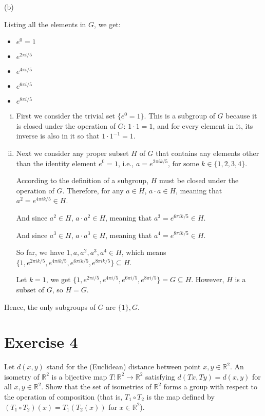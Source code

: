 \documentclass{article}
\begin{document}
(b)

Listing all the elements in $G$, we get:

\begin{itemize}
\item $e^0 = 1$
\item $e^{2\pi i/5}$
\item $e^{4\pi i/5}$
\item $e^{6\pi i/5}$
\item $e^{8\pi i/5}$
\end{itemize}

\begin{enumerate}[(i)]
\item First we consider the trivial set $\{e^0 = 1\}$. This is a subgroup of $G$ because it is closed under the operation of $G$: $1 \cdot 1 = 1$, and for every element in it, its inverse is also in it so that $1 \cdot 1^{-1} = 1$.

\item Next we consider any proper subset $H$ of $G$ that contains any elements other than the identity element $e^0 = 1$, i.e., $a = e^{2\pi i k/5} \text{, for some } k \in \{1,2,3,4\}$.

According to the definition of a subgroup, $H$ must be closed under the operation of $G$. Therefore, for any $a \in H$, $a \cdot a \in H$, meaning that $a^2 = e^{4\pi i k/5} \in H$.

And since $a^2 \in H$, $a \cdot a^2 \in H$, meaning that $a^3 = e^{6\pi i k/5} \in H$.

And since $a^3 \in H$, $a \cdot a^3 \in H$, meaning that $a^4 = e^{8\pi i k/5} \in H$.

So far, we have $1, a, a^2, a^3, a^4 \in H$, which means $\{1, e^{2\pi i k/5}, e^{4\pi i k/5}, e^{6\pi i k/5}, e^{8\pi i k/5}\} \subseteq H$.

Let $k=1$, we get $\{1, e^{2\pi i/5}, e^{4\pi i/5}, e^{6\pi i/5}, e^{8\pi i/5}\} = G \subseteq H$. However, $H$ is a subset of $G$, so $H=G$.

\end{enumerate}

Hence, the only subgroups of $G$ are $\{1\}, G$.

\newpage

\section*{Exercise 4}

Let $d(x,y)$ stand for the (Euclidean) distance between point $x,y \in \mathbb{R}^2$. An isometry of $\mathbb{R}^2$ is a bijective map $T: \mathbb{R}^2 \to \mathbb{R}^2$ satisfying $d(Tx,Ty)=d(x,y)$ for all $x,y \in \mathbb{R}^2$. Show that the set of isometries of $\mathbb{R}^2$ forms a group with respect to the operation of composition (that is, $T_1 \circ T_2$ is the map defined by $(T_1 \circ T_2)(x)=T_1(T_2(x))$ for $x \in \mathbb{R}^2$). \\
\end{document}
